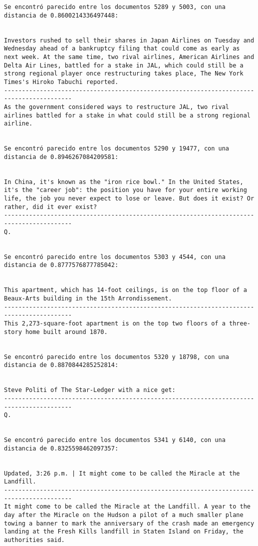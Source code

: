 \documentclass[11pt]{article}
\begin{document}
\begin{Verbatim}[commandchars=\\\{\}]
Se encontró parecido entre los documentos 5289 y 5003, con una distancia de 0.8600214336497448:


Investors rushed to sell their shares in Japan Airlines on Tuesday and Wednesday ahead of a bankruptcy filing that could come as early as next week. At the same time, two rival airlines, American Airlines and Delta Air Lines, battled for a stake in JAL, which could still be a strong regional player once restructuring takes place, The New York Times's Hiroko Tabuchi reported.
-----------------------------------------------------------------------------------------
As the government considered ways to restructure JAL, two rival airlines battled for a stake in what could still be a strong regional airline.


Se encontró parecido entre los documentos 5290 y 19477, con una distancia de 0.8946267084209581:


In China, it's known as the "iron rice bowl." In the United States, it's the "career job": the position you have for your entire working life, the job you never expect to lose or leave. But does it exist? Or rather, did it ever exist?
-----------------------------------------------------------------------------------------
Q.


Se encontró parecido entre los documentos 5303 y 4544, con una distancia de 0.8777576877785042:


This apartment, which has 14-foot ceilings, is on the top floor of a Beaux-Arts building in the 15th Arrondissement.
-----------------------------------------------------------------------------------------
This 2,273-square-foot apartment is on the top two floors of a three-story home built around 1870.


Se encontró parecido entre los documentos 5320 y 18798, con una distancia de 0.8870844285252814:


Steve Politi of The Star-Ledger with a nice get:
-----------------------------------------------------------------------------------------
Q.


Se encontró parecido entre los documentos 5341 y 6140, con una distancia de 0.8325598462097357:


Updated, 3:26 p.m. | It might come to be called the Miracle at the Landfill.
-----------------------------------------------------------------------------------------
It might come to be called the Miracle at the Landfill. A year to the day after the Miracle on the Hudson a pilot of a much smaller plane towing a banner to mark the anniversary of the crash made an emergency landing at the Fresh Kills landfill in Staten Island on Friday, the authorities said.



\end{Verbatim}
\end{document}
